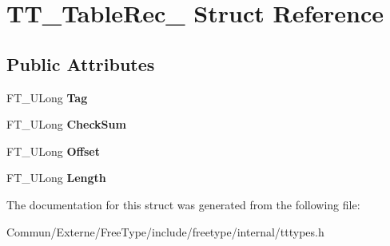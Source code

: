 \hypertarget{struct_t_t___table_rec__}{}\section{T\+T\+\_\+\+Table\+Rec\+\_\+ Struct Reference}
\label{struct_t_t___table_rec__}
\subsection*{Public Attributes}
\begin{DoxyCompactItemize}
\item 
F\+T\+\_\+\+U\+Long {\bfseries Tag}\hypertarget{struct_t_t___table_rec___aaccaf9e9d3421fc37fa6e51875534995}{}\label{struct_t_t___table_rec___aaccaf9e9d3421fc37fa6e51875534995}

\item 
F\+T\+\_\+\+U\+Long {\bfseries Check\+Sum}\hypertarget{struct_t_t___table_rec___aacf9207fae3522bb65359c2288900fca}{}\label{struct_t_t___table_rec___aacf9207fae3522bb65359c2288900fca}

\item 
F\+T\+\_\+\+U\+Long {\bfseries Offset}\hypertarget{struct_t_t___table_rec___a91840e1cee040f8da6a34a081dda17b6}{}\label{struct_t_t___table_rec___a91840e1cee040f8da6a34a081dda17b6}

\item 
F\+T\+\_\+\+U\+Long {\bfseries Length}\hypertarget{struct_t_t___table_rec___aa0d3a1f4491bf4418bc26241bdd7d21b}{}\label{struct_t_t___table_rec___aa0d3a1f4491bf4418bc26241bdd7d21b}

\end{DoxyCompactItemize}


The documentation for this struct was generated from the following file\+:\begin{DoxyCompactItemize}
\item 
Commun/\+Externe/\+Free\+Type/include/freetype/internal/tttypes.\+h\end{DoxyCompactItemize}
